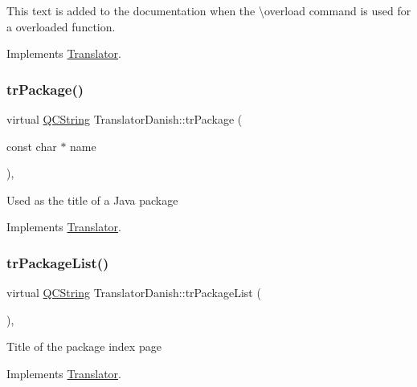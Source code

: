 This text is added to the documentation when the \textbackslash{}overload command is used for a overloaded function. 

Implements \mbox{\hyperlink{class_translator}{Translator}}.

\mbox{\label{class_translator_danish_a66689727e8bef2dc6e9974a4f777437f}} 
\subsubsection{\texorpdfstring{trPackage()}{trPackage()}}
{\footnotesize\ttfamily virtual \mbox{\hyperlink{class_q_c_string}{Q\+C\+String}} Translator\+Danish\+::tr\+Package (\begin{DoxyParamCaption}\item[{const char $\ast$}]{name }\end{DoxyParamCaption})\hspace{0.3cm}{\ttfamily [inline]}, {\ttfamily [virtual]}}

Used as the title of a Java package 

Implements \mbox{\hyperlink{class_translator}{Translator}}.

\mbox{\label{class_translator_danish_a92105d770b28183e101d07842a3d4c6c}} 
\subsubsection{\texorpdfstring{trPackageList()}{trPackageList()}}
{\footnotesize\ttfamily virtual \mbox{\hyperlink{class_q_c_string}{Q\+C\+String}} Translator\+Danish\+::tr\+Package\+List (\begin{DoxyParamCaption}{ }\end{DoxyParamCaption})\hspace{0.3cm}{\ttfamily [inline]}, {\ttfamily [virtual]}}

Title of the package index page 

Implements \mbox{\hyperlink{class_translator}{Translator}}.

\mbox{\label{class_translator_danish_a3a4ee7f0a8edc758c93b4529125bddca}} 
